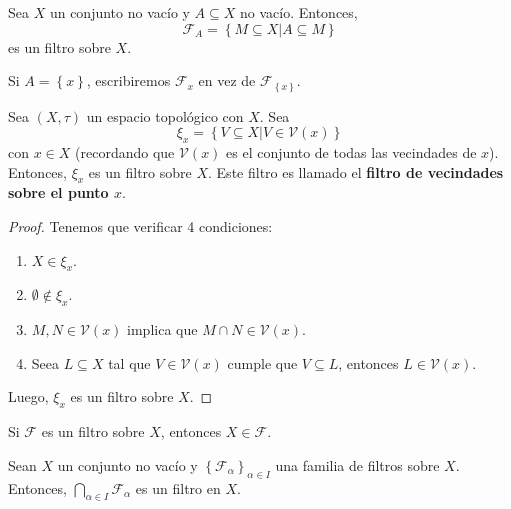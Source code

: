 \documentclass[12pt]{report}
\theoremstyle{largebreak}
\newcommand{\V}[1]{\ensuremath{\mathcal{V}(#1)}}
\begin{document}
    \begin{exa}
        Sea $X$ un conjunto no vacío y $A\subseteq X$ no vacío. Entonces,
        \begin{equation*}
            \mathcal{F}_A=\left\{M\subseteq X\Big|A\subseteq M \right\}
        \end{equation*}
        es un filtro sobre $X$.
    \end{exa}

    \begin{obs}
        Si $A=\left\{ x\right\}$, escribiremos $\mathcal{F}_{x}$ en vez de $\mathcal{F}_{\left\{x\right\}}$.
    \end{obs}

    \begin{exa}
        Sea $(X,\tau)$ un espacio topológico con $X$. Sea
        \begin{equation*}
            \xi_x=\left\{V\subseteq X\Big|V\in\V{x}\right\}
        \end{equation*}
        con $x\in X$ (recordando que $\V{x}$ es el conjunto de todas las vecindades de $x$). Entonces, $\xi_x$ es un filtro sobre $X$. Este filtro es llamado el \textbf{filtro de vecindades sobre el punto $x$}.
    \end{exa}

    \begin{proof}
        Tenemos que verificar 4 condiciones:
        \begin{enumerate}
            \item $X\in\xi_x$.
            \item $\emptyset\notin\xi_x$.
            \item $M,N\in\V{x}$ implica que $M\cap N\in\V{x}$.
            \item Seea $L\subseteq X$ tal que $V\in\V{x}$ cumple que $V\subseteq L$, entonces $L\in\V{x}$.
        \end{enumerate}
        Luego, $\xi_x$ es un filtro sobre $X$.
    \end{proof}

    \begin{obs}
        Si $\mathcal{F}$ es un filtro sobre $X$, entonces $X\in\mathcal{F}$.
    \end{obs}

    \begin{propo}
        Sean $X$ un conjunto no vacío y $\left\{\mathcal{F}_\alpha\right\}_{\alpha\in I}$ una familia de filtros sobre $X$. Entonces, $\bigcap_{\alpha\in I}\mathcal{F}_\alpha$ es un filtro en $X$.
    \end{propo}
\end{document}
